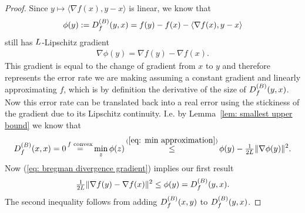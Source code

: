 \begin{proof}
	Since \(y\mapsto \langle\nabla f(x), y-x\rangle\) is linear, we know that
	\begin{align*}
		\phi(y):=D^{(B)}_{f}(y,x) = f(y)-f(x)-\langle \nabla f(x), y-x\rangle 
	\end{align*}
	still has \(L\)-Lipschitz gradient
	\begin{align}\label{eq: bregman divergence gradient}
		\nabla\phi(y) = \nabla f(y) - \nabla f(x).
	\end{align}
	This gradient is equal to the change of gradient from \(x\) to \(y\) and 
	therefore represents the error rate we are making assuming a constant gradient
	and linearly approximating \(f\), which is by definition the derivative of the size of
	\(D^{(B)}_{f}(y,x)\). Now this error rate can be translated
 	back into a real error using the stickiness of the gradient due to
	its Lipschitz continuity. I.e. by Lemma~\ref{lem: smallest upper bound} we know that
	\begin{align*}
		\bregmanDiv{f}(x,x) = 0
		\xeq{f\text{ convex}} \min_z\phi(z)
		\xle{(\ref{eq: min approximation})} \phi(y) - \tfrac{1}{2\ubound}\|\nabla \phi(y)\|^2.
	\end{align*}
	Now (\ref{eq: bregman divergence gradient}) implies our first result
	\begin{align*}
		\tfrac{1}{2L}\|\nabla f(y) - \nabla f(x)\|^2
		\le \phi(y) =D^{(B)}_{f}(y,x).
	\end{align*}
	The second inequality follows from adding \(D^{(B)}_{f}(x,y)\) to
	\(D^{(B)}_{f}(y,x)\).
\end{proof}

